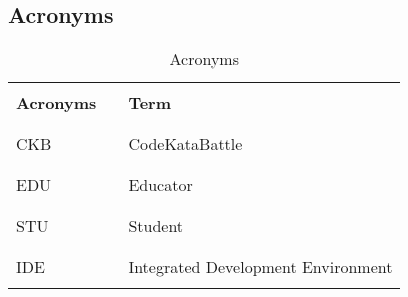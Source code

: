 \subsection{Acronyms}
\begin{table}[H]
    \centering
    \renewcommand{\arraystretch}{0.5}
    \begin{tabular}{l l p{11cm}}
        \hline
                          &        &                                            \\
        \textbf{Acronyms} & \vline & \textbf{Term}                              \\
                          &        &                                            \\\hline & & \\
        CKB               & \vline & CodeKataBattle                             \\
                          &        &                                            \\\hline & & \\
        EDU               & \vline & Educator                                   \\
                          &        &                                            \\\hline & & \\
        STU               & \vline & Student                                    \\
                          &        &                                            \\\hline & & \\
        IDE               & \vline & Integrated Development Environment         \\
                          &        &                                            \\
        \hline
    \end{tabular}
    \caption{Acronyms}
\end{table}

